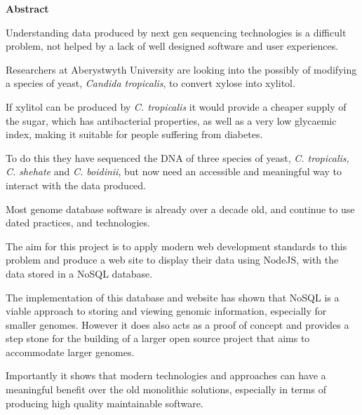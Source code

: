 \thispagestyle{empty}

\begin{center}
    {\LARGE\bf Abstract}
\end{center}

Understanding data produced by next gen sequencing technologies is a difficult problem, not helped by a lack of well designed software and user experiences. 

Researchers at Aberystwyth University are looking into the possibly of modifying a species of yeast, \textit{Candida tropicalis}, to convert xylose into xylitol. 

If xylitol can be produced by \textit{C. tropicalis} it would provide a cheaper supply of the sugar, which has antibacterial properties, as well as a very low glycaemic index, making it suitable for people suffering from diabetes.

To do this they have sequenced the DNA of three species of yeast, \textit{C. tropicalis, C. shehate} and \textit{C. boidinii}, but now need an accessible and meaningful way to interact with the data produced.

Most genome database software is already over a decade old, and continue to use dated practices, and technologies. 

The aim for this project is to apply modern web development standards to this problem and produce a web site to display their data using NodeJS, with the data stored in a NoSQL database. 

The implementation of this database and website has shown that NoSQL is a viable approach to storing and viewing genomic information, especially for smaller genomes. However it does also acts as a proof of concept and provides a step stone for the building of a larger open source project that aims to accommodate larger genomes. 

Importantly it shows that modern technologies and approaches can have a meaningful benefit over the old monolithic solutions, especially in terms of producing high quality maintainable software.

